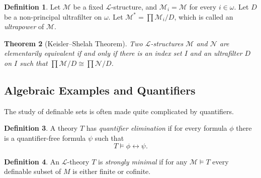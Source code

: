 \documentclass{amsart}
\newtheorem{theorem}{Theorem}[subsection]
\theoremstyle{definition}
\newtheorem{definition}[theorem]{Definition}
\numberwithin{equation}{section}
\begin{document}
\begin{definition}
	Let $\mathcal{M}$ be a fixed $\mathcal{L}$-structure,
	and $\mathcal{M}_i = \mathcal{M}$ for every $i \in \omega$.
	Let $D$ be a non-principal ultrafilter on $\omega$.
	Let $\mathcal{M}^* = \prod \mathcal{M}_i / D$,
	which is called an \emph{ultrapower} of $\mathcal{M}$.
\end{definition}

\begin{theorem}[Keisler--Shelah Theorem]
	Two $\mathcal{L}$-structures $\mathcal{M}$ and $\mathcal{N}$ are elementarily equivalent
	if and only if there is an index set $I$ and an ultrafilter $D$ on $I$ such that $\prod \mathcal{M}/D \cong \prod \mathcal{N}/D$.
\end{theorem}

\subsection{Algebraic Examples and Quantifiers}

\begin{center}
	\begin{tcolorbox}[title = Properties of theories]
		\begin{center}
		\end{center}
	\end{tcolorbox}
\end{center}

The study of definable sets is often made quite complicated by quantifiers.

\begin{definition}
	A theory $T$ has \emph{quantifier elimination} if for every formula $\phi$ there is a quantifier-free formula $\psi$ such that
	\[
		T \models \phi \leftrightarrow \psi.
	\]
\end{definition}

\begin{definition}
	An $\mathcal{L}$-theory $T$ is \emph{strongly minimal} if for any $\mathcal{M} \models T$
	every definable subset of $M$ is either finite or cofinite.
\end{definition}
\end{document}
